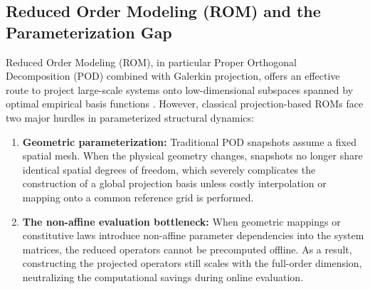 \subsection{Reduced Order Modeling (ROM) and the Parameterization Gap}
Reduced Order Modeling (ROM), in particular Proper Orthogonal Decomposition (POD) combined with Galerkin projection, offers an effective route to project large-scale systems onto low-dimensional subspaces spanned by optimal empirical basis functions \cite{Benner2015, quarteroni2014}. However, classical projection-based ROMs face two major hurdles in parameterized structural dynamics:
\begin{enumerate}
    \item \textbf{Geometric parameterization:} Traditional POD snapshots assume a fixed spatial mesh. When the physical geometry changes, snapshots no longer share identical spatial degrees of freedom, which severely complicates the construction of a global projection basis unless costly interpolation or mapping onto a common reference grid is performed.
    \item \textbf{The non-affine evaluation bottleneck:} When geometric mappings or constitutive laws introduce non-affine parameter dependencies into the system matrices, the reduced operators cannot be precomputed offline. As a result, constructing the projected operators still scales with the full-order dimension, neutralizing the computational savings during online evaluation.
\end{enumerate}

